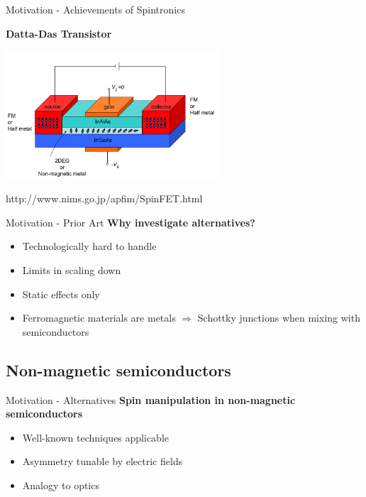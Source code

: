 \documentclass{beamer}
\begin{document}
\begin{frame}{Motivation - Achievements of Spintronics}
    \begin{center}
    \textbf{Datta-Das Transistor}

    \includegraphics[width=8cm]{SpinFET.png}

    \vfill
    \footnotesize http://www.nims.go.jp/apfim/SpinFET.html
    \end{center}

\end{frame}

\begin{frame}{Motivation - Prior Art}
    \textbf{Why investigate alternatives?}

	\begin{itemize}
		\item Technologically hard to handle
        \item Limits in scaling down
        \item Static effects only
		\item Ferromagnetic materials are metals
            $\Rightarrow$ Schottky junctions when mixing with semiconductors
	\end{itemize}
\end{frame}

\subsection{Non-magnetic semiconductors}
\begin{frame}{Motivation - Alternatives}
    \textbf{Spin manipulation in non-magnetic semiconductors}

	\begin{itemize}
		\item Well-known techniques applicable
        \item Asymmetry tunable by electric fields
        \item Analogy to optics
	\end{itemize}
\end{frame}
\end{document}
